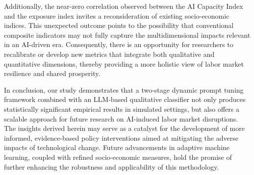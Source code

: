 \documentclass{article}
\begin{document}
Additionally, the near-zero correlation observed between the AI Capacity Index and the exposure index invites a reconsideration of existing socio-economic indices. This unexpected outcome points to the possibility that conventional composite indicators may not fully capture the multidimensional impacts relevant in an AI-driven era. Consequently, there is an opportunity for researchers to recalibrate or develop new metrics that integrate both qualitative and quantitative dimensions, thereby providing a more holistic view of labor market resilience and shared prosperity.

In conclusion, our study demonstrates that a two-stage dynamic prompt tuning framework combined with an LLM-based qualitative classifier not only produces statistically significant empirical results in simulated settings, but also offers a scalable approach for future research on AI-induced labor market disruptions. The insights derived herein may serve as a catalyst for the development of more informed, evidence-based policy interventions aimed at mitigating the adverse impacts of technological change. Future advancements in adaptive machine learning, coupled with refined socio-economic measures, hold the promise of further enhancing the robustness and applicability of this methodology.
\end{document}

